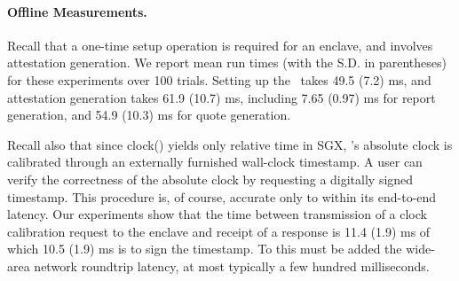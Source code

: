 \paragraph{Offline Measurements.}
Recall that a one-time setup operation is required 
for an enclave, and involves attestation generation. We report mean run times (with the S.D. in parentheses) for these experiments over 100 trials.
Setting up the \tc~\encname takes
49.5 (7.2) ms,
and attestation generation takes 
61.9 (10.7) ms, including
7.65 (0.97) ms for report generation, 
and 54.9 (10.3) ms for quote generation.

Recall also that since clock() yields only relative time in SGX, \tc's absolute clock is calibrated through an externally furnished wall-clock timestamp.
A user can verify the correctness of the \encname absolute clock by requesting a digitally signed timestamp.
This procedure is, of course, accurate only to within its end-to-end latency. Our experiments show that the time between \medname transmission of a clock calibration request to the enclave and receipt of a response is
11.4 (1.9) ms of which 10.5 (1.9) ms is to 
sign the timestamp.
To this must be added the wide-area network roundtrip latency, at most typically a few hundred milliseconds. %
